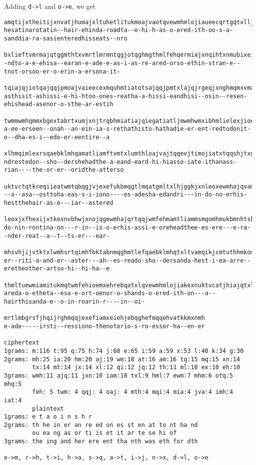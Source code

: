 Adding \verb!d->l! and \verb!o->e!, we get
  \begin{Verbatim}[frame=single,fontsize=\tiny]
amqtijxtheitijxnvatjhumajxltuhetlitukmoajvaotqvewmhmlojiaueecqrtgqtxlljtnhtrqtqjmximhmlajqqmtiqgbxhe
hesatinarotatin--hair-ehinda-roadta--e-hi-h-as-o-ered-ith-oo-s-a-sanddia-ra-sasienteredhisseats--nro

bxlieftvmrmajqtggmthtxvmrtlmrmntqgjotqghmgthmlfehqermiajxnqihtxnmubixeifehqeewmhgeomhjxntgmhqextkjis
-ndto-a-e-ehisa--earan-e-ade-e-as-i-as-re-ared-orso-ethin-stran-e--tnot-orsoo-er-o-erin-a-ersona-it-

tqiajqjiotqajqqjpmoajvaieecexmquhmtiatotsajqqjpmtxlajqjrgeqjxnghmqmxvmajqamtlotqmxehrebqiamkthnmqija
asthisit-ashissi-e-hi-htoo-ones-reatha-a-hissi-eandhisi--osin--resen-ehishead-asenor-o-sthe-ar-estih

twmmwmhqmmxbgextabrtxumjxnjtrqbhmiatiajqiegatiatljmwmhwmxibhmlielexjioebklatwmqkjggmlewmhrmmxijhmkst
a-ee-erseen--onah--an-ein-ia-s-rethathisto-hathadie-er-ent-redtodonit-o--dha-es-i--edo-er-eentire--a

xlhmqimlexrsqaebklmhqamatliamftvmtxlumthloajvajtqqevjtimojiatxtqqshjtxubkkiamfehrmhfkehjliamktiimhqe
ndrestedon--sho--dershehadthe-a-eand-eard-hi-hiasso-iate-ithanass-rian----the-or-er--oridthe-atterso

uktvctqtkreqiieatwmtqbqgjvjexefukbmqgtlmqatgmltxlhjggkjxnleoxewmhajqvamqiiamatjhotqgmvbkjthgktqimhml
--a--asa--osttoha-eas-s-i-iono----es-adesha-edandri---in-do-no-erhis-hestthehair-as-e---iar--astered

leoxjxfhexijxtkexnvbhwjxnojqgewmhajqrtqqjwmfehmamtliammsmqomhmukbmnhtsbxlmhnhmtiuktvcibfiqwmhsvkmthw
do-nin-rontina-on---r-in--is-o-erhis-assi-e-oreheadthee-es-ere---e-ra--nder-reat--a--t--ts-er---ear-

mhsvhjijvtktxlwmhsrtqimhfbktabnmqghmtlefqaebklmhqtxltvamqikjcmtuthhmkomhmiameiamhgthiqefajroajvatggm
er--riti-a-and-er--aster---ah--es-reado-sho--dersanda-hest-i-ea-arre--eretheother-artso-hi--hi-ha--e

thmltuewmiamitukmqtwmfehioemxehrebqatxlqvewmhmlojiakexnuktvcatjhiajqtxltumkkeojxnhethjxnhbrukjxnwejv
areda-o-etheta--esa-e-ort-oenor-o-shands-o-ered-ith-on---a--hairthisanda-e--o-in-roarin-r----in--oi-

mrtlmbgrsfjhqijrghmqqjexefiamxeiehjebqghefmqqehvatkkmxnmh
e-ade-----irsti--ressiono-thenotorio-s-ro-essor-ha--en-er

ciphertext
1grams: m:116 t:95 q:75 h:74 j:68 e:65 i:59 a:59 x:53 l:40 k:34 g:30
2grams: mh:25 ia:20 hm:20 aj:19 wm:18 at:16 am:16 tq:15 mq:15 xn:14
        tx:14 mt:14 jx:14 xl:12 qi:12 jq:12 th:11 ml:10 ex:10 eh:10
3grams: wmh:11 ajq:11 jxn:10 iam:10 txl:9 hml:7 ewm:7 mhm:6 otq:5 mhq:5
        feh: 5 twm: 4 qqj: 4 oaj: 4 mth:4 mqi:4 mia:4 jva:4 imh:4 iat:4
        plaintext
1grams: e t a o i n s h r
2grams: th he in er an re ed on es st en at to nt ha nd
        ou ea ng as or ti is et it ar te se hi of
3grams: the ing and her ere ent tha nth was eth for dth

e->m, r->h, t->i, h->a, s->q, a->t, i->j, n->x, d->l, o->e
\end{Verbatim}

